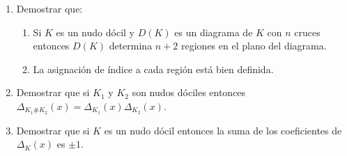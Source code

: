 \documentclass[12pt]{report}
\begin{document}
\begin{enumerate}
\item Demostrar que:
\begin{enumerate}
\item Si $K$ es un nudo dócil y $D(K)$ es un diagrama de $K$ con $n$ cruces entonces $D(K)$ determina $n+2$ regiones en el plano del diagrama.

\item La asignación de índice a cada región está bien definida.
\end{enumerate}

\item Demostrar que si $K_1$ y $K_2$ son nudos dóciles entonces $\Delta_{K_1 \# K_2}(x) = \Delta_{K_1} (x) \Delta_{K_2} (x)$.

\item Demostrar que si $K$ es un nudo dócil entonces la suma de los coeficientes de $\Delta_K(x)$ es $\pm 1$.

\end{enumerate}
\end{document}
